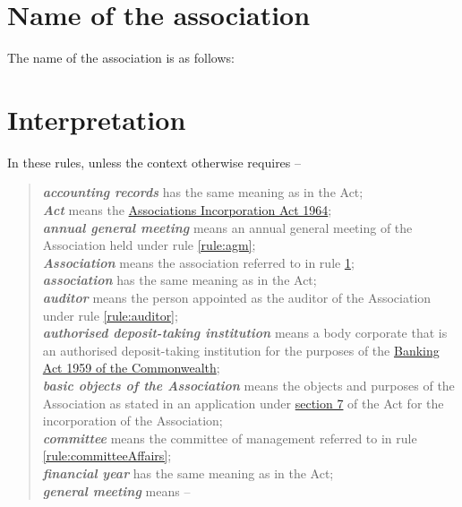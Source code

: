 \documentclass[a4paper,11pt]{article}
\begin{document}
\section{Name of the association}
\label{rule:name}

The name of the association is as follows:\\
\textbf{\orgName{}}

\section{Interpretation}
\label{rule:interpretation}

In these rules, unless the context otherwise requires --
\begin{quote}
	\textit{\textbf{accounting records}} has the same meaning as in the Act;\\
	\textit{\textbf{Act}} means the \href{https://www.legislation.tas.gov.au/view/html/inforce/2019-05-06/act-1964-064}{Associations Incorporation Act 1964};\\
	\textit{\textbf{annual general meeting}} means an annual general meeting of the Association held under rule \ref{rule:agm};\\
	\textit{\textbf{Association}} means the association referred to in rule \ref{rule:name};\\
	\textit{\textbf{association}} has the same meaning as in the Act;\\
	\textit{\textbf{auditor}} means the person appointed as the auditor of the Association under rule \ref{rule:auditor};\\
	\textit{\textbf{authorised deposit-taking institution}} means a body corporate that is an authorised deposit-taking institution for the purposes of the \href{https://www.legislation.gov.au/Details/C2017C00067}{Banking Act 1959 of the Commonwealth};\\
	\textit{\textbf{basic objects of the Association}} means the objects and purposes of the Association as stated in an application under \href{https://www.legislation.tas.gov.au/view/html/inforce/2019-05-06/act-1964-064#GS7@EN}{section 7} of the Act for the incorporation of the Association;\\
	\textit{\textbf{committee}} means the committee of management referred to in rule \ref{rule:committeeAffairs};\\
	\textit{\textbf{financial year}} has the same meaning as in the Act;\\
	\textit{\textbf{general meeting}} means --

\end{quote}
\end{document}
